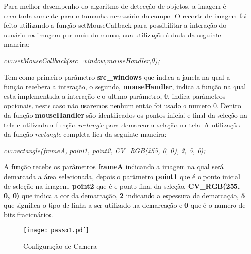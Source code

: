 Para melhor desempenho do algoritmo de detecção de objetos, a imagem é recortada somente para o tamanho necessário do campo. O recorte de imagem foi feito utilizando a função setMouseCallback para possibilitar a interação do usuário na imagem por meio do mouse, sua utilização é dada da seguinte maneira:
\begin{center}
\centering \textit{ cv::setMouseCallback(src\_window,mouseHandler,0);}
\end{center}
Tem como primeiro parâmetro \textbf{src\_windows} que indica a janela na qual a função recebera a interação,  o segundo, \textbf{mouseHandler}, indica a função na qual esta implementada a interação e o ultimo parâmetro, \textbf{0}, indica parâmetros opcionais, neste caso não usaremos nenhum então foi usado o numero 0.
Dentro da função \textbf{mouseHandler} são identificados os pontos iniciai e final da seleção na tela e utilizada a função \textit{rectangle} para demarcar a seleção na tela. A utilização da função \textit{rectangle} completa fica da seguinte maneira:
\begin{center}
\centering \textit{ cv::rectangle(frameA, point1, point2, CV\_RGB(255, 0, 0), 2, 5, 0);}
\end{center}
A função recebe os parâmetros \textbf{frameA} indicando a imagem na qual será demarcada a área selecionada, depois o parâmetro \textbf{point1} que é o ponto inicial de seleção na imagem, \textbf{point2} que é o ponto final da seleção. \textbf{CV\_RGB(255, 0, 0)} que indica a cor da demarcação, \textbf{2} indicando a espessura da demarcação, \textbf{5} que significa o tipo de linha a ser utilizado na demarcação e \textbf{0} que é o numero de bits fracionários.

\begin{figure}[H]
			\centering
			\texttt{[image: passo1.pdf]}
			\caption{ Configuração de Camera}
			\label{Configuracao}
		\end{figure}		


